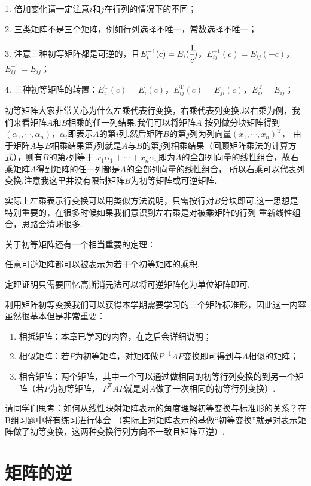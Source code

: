 1. 倍加变化请一定注意$i$和$j$在行列的情况下的不同；

2. 三类矩阵不是三个矩阵，例如行列选择不唯一，常数选择不唯一；

3. 注意三种初等矩阵都是可逆的，且$E_i^{-1}(c)=E_i(\cfrac{1}{c})$，$E_{ij}^{-1}(c)=E_{ij}(-c)$，$E_{ij}^{-1}=E_{ij}$；

4. 三种初等矩阵的转置：$E_i^\mathrm{T}(c)=E_i(c)$，$E_{ij}^\mathrm{T}(c)=E_{ji}(c)$，$E_{ij}^\mathrm{T}=E_{ij}$；

初等矩阵大家非常关心为什么左乘代表行变换，右乘代表列变换.以右乘为例，我们来看矩阵$A$和$B$相乘的任一列结果.我们可以将矩阵$A$
按列做分块矩阵得到$(\alpha_1,\cdots,\alpha_n)$，$\alpha_i$即表示$A$的第$i$列.然后矩阵$B$的第$j$列为列向量$(x_1,\cdots,x_n)^\mathrm{T}$，
由于矩阵$A$与$B$相乘结果第$j$列就是$A$与$B$的第$j$列相乘结果（回顾矩阵乘法的计算方式），则有$B$的第$i$列等于
$x_1\alpha_1+\cdots+x_n\alpha_n$即为$A$的全部列向量的线性组合，故右乘矩阵$A$得到矩阵的任一列都是$A$的全部列向量的线性组合，
所以右乘可以代表列变换.注意我这里并没有限制矩阵$B$为初等矩阵或可逆矩阵.

实际上左乘表示行变换可以用类似方法说明，只需按行对$B$分块即可.这一思想是特别重要的，在很多时候如果我们意识到左右乘是对被乘矩阵的行列
重新线性组合，思路会清晰很多.

关于初等矩阵还有一个相当重要的定理：
\begin{theorem}
	任意可逆矩阵都可以被表示为若干个初等矩阵的乘积.
\end{theorem}
定理证明只需要回忆高斯消元法可以将可逆矩阵化为单位矩阵即可.

利用矩阵初等变换我们可以获得本学期需要学习的三个矩阵标准形，因此这一内容虽然很基本但是非常重要：
\begin{enumerate}
	\item 相抵矩阵：本章已学习的内容，在之后会详细说明；
	\item 相似矩阵：若$P$为初等矩阵，对矩阵做$P^{-1}AP$变换即可得到与$A$相似的矩阵；
	\item 相合矩阵：两个矩阵，其中一个可以通过做相同的初等行列变换的到另一个矩阵（若$P$为初等矩阵，
	$P^{\mathrm{T}}AP$就是对$A$做了一次相同的初等行列变换）.
\end{enumerate}
请同学们思考：如何从线性映射矩阵表示的角度理解初等变换与标准形的关系？在B组习题中将有练习进行体会
（实际上对矩阵表示的基做“初等变换”就是对表示矩阵做了初等变换，这两种变换行列方向不一致且矩阵互逆）.

\section{矩阵的逆}
